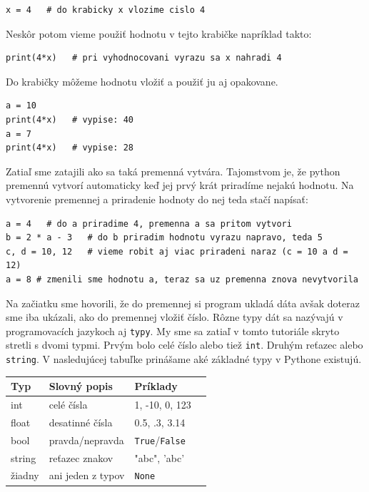\documentclass{article}
\begin{document}
\begin{lstlisting}
x = 4   # do krabicky x vlozime cislo 4
\end{lstlisting}

Neskôr potom vieme použiť hodnotu v tejto krabičke napríklad takto:

\begin{lstlisting}
print(4*x)   # pri vyhodnocovani vyrazu sa x nahradi 4
\end{lstlisting}

Do krabičky môžeme hodnotu vložiť a použiť ju aj opakovane.

\begin{lstlisting}
a = 10
print(4*x)   # vypise: 40
a = 7
print(4*x)   # vypise: 28
\end{lstlisting}

Zatiaľ sme zatajili ako sa taká premenná vytvára. Tajomstvom je, že python premennú vytvorí automaticky keď jej prvý krát priradíme nejakú hodnotu. Na vytvorenie premennej a priradenie hodnoty do nej teda stačí napísať:

\begin{lstlisting}
a = 4   # do a priradime 4, premenna a sa pritom vytvori
b = 2 * a - 3   # do b priradim hodnotu vyrazu napravo, teda 5
c, d = 10, 12   # vieme robit aj viac priradeni naraz (c = 10 a d = 12)
a = 8 # zmenili sme hodnotu a, teraz sa uz premenna znova nevytvorila
\end{lstlisting}

Na začiatku sme hovorili, že do premennej si program ukladá dáta avšak doteraz sme iba ukázali, ako do premennej vložiť číslo. Rôzne typy dát sa nazývajú v programovacích jazykoch aj \texttt{typy}. My sme sa zatiaľ v tomto tutoriále skryto stretli s dvomi typmi. Prvým bolo celé číslo alebo tiež \texttt{int}. Druhým reťazec alebo \texttt{string}. V nasledujúcej tabuľke prinášame aké základné typy v Pythone existujú.

\smallskip
\begin{tabular}{|l|l|l|l|}
\hline
Typ & Slovný popis & Príklady \\ \hline
int & celé čísla & 1, -10, 0, 123 \\ \hline
float & desatinné čísla & 0.5, .3, 3.14  \\ \hline
bool & pravda/nepravda & \texttt{True}/\texttt{False} \\ \hline
string & reťazec znakov & "abc", 'abc' \\ \hline
žiadny & ani jeden z typov & \texttt{None} \\ \hline
\end{tabular}
\smallskip
\end{document}
